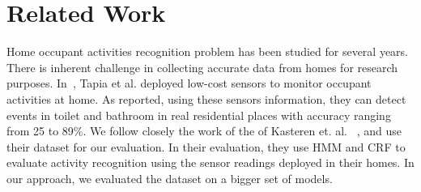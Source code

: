 \section{Related Work}

Home occupant activities recognition problem has been studied for several years. There is inherent challenge in collecting accurate data from homes for research purposes. In~\cite{emtapia}, Tapia et al. deployed low-cost sensors to monitor occupant activities at home. As reported, using these sensors information, they can detect events in toilet and bathroom in real residential places with accuracy ranging from 25 to 89\%. 
We follow closely the work of the of Kasteren et. al. ~\cite{tvkasteren}, and use their dataset for our evaluation. In their evaluation, they use HMM and CRF to evaluate activity recognition using the sensor readings deployed in their homes. In our approach, we evaluated the dataset on a bigger set of models. 



